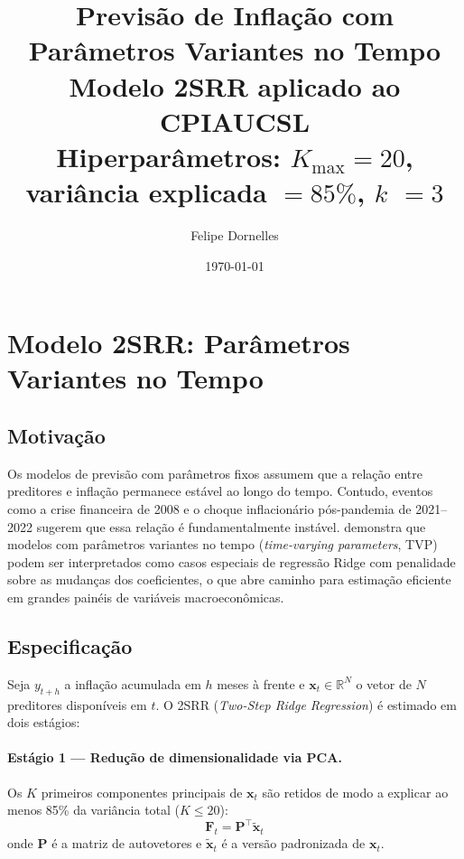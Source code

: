 \documentclass[12pt, a4paper]{article}
\begin{document}
\title{\textbf{Previsão de Inflação com Parâmetros Variantes no Tempo}\\
       \large Modelo 2SRR aplicado ao CPIAUCSL\\[0.4em]
       \normalsize Hiperparâmetros: $K_{\max}=20$,
       variância explicada $= 85\%$, $k$ $= 3$}
\author{Felipe Dornelles}
\date{\today}
\maketitle
\newpage
\tableofcontents
\newpage

\section{Modelo 2SRR: Parâmetros Variantes no Tempo}
\label{sec:modelo}

\subsection{Motivação}

Os modelos de previsão com parâmetros fixos assumem que a relação
entre preditores e inflação permanece estável ao longo do tempo.
Contudo, eventos como a crise financeira de 2008 e o choque
inflacionário pós-pandemia de 2021--2022 sugerem que essa relação
é fundamentalmente instável. \citet{Coulombe2021} demonstra que
modelos com parâmetros variantes no tempo
(\textit{time-varying parameters}, TVP) podem ser interpretados
como casos especiais de regressão Ridge com penalidade sobre as
mudanças dos coeficientes, o que abre caminho para estimação
eficiente em grandes painéis de variáveis macroeconômicas.

\subsection{Especificação}

Seja $y_{t+h}$ a inflação acumulada em $h$ meses à frente e
$\mathbf{x}_t \in \mathbb{R}^N$ o vetor de $N$ preditores
disponíveis em $t$. O 2SRR (\textit{Two-Step Ridge Regression})
é estimado em dois estágios:

\paragraph{Estágio 1 — Redução de dimensionalidade via PCA.}
Os $K$ primeiros componentes principais de $\mathbf{x}_t$ são
retidos de modo a explicar ao menos 85\% da variância total
($K \leq 20$):
\[
  \mathbf{F}_t = \mathbf{P}^\top \tilde{\mathbf{x}}_t
\]
onde $\mathbf{P}$ é a matriz de autovetores e
$\tilde{\mathbf{x}}_t$ é a versão padronizada de $\mathbf{x}_t$.
\end{document}
